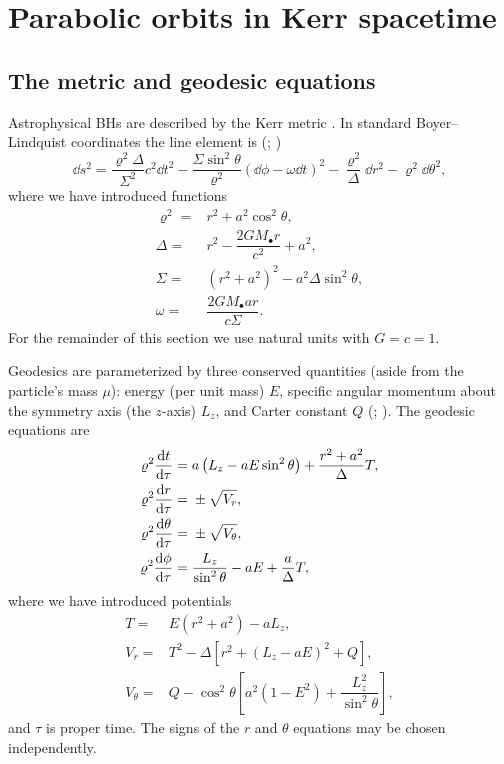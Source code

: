 \section{Parabolic orbits in Kerr spacetime}\label{sec:Geodesic}

\subsection{The metric and geodesic equations}

Astrophysical BHs are described by the Kerr metric \citep{Kerr1963}. In standard Boyer--Lindquist coordinates the line element is (\citealt{Boyer1967}; \citealt[section 13.7]{Hobson2006})
\begin{equation}
\dd s^2 = \dfrac{\varrho^2 \Delta}{\Sigma^2}c^2\dd t^2 - \dfrac{\Sigma \sin^2 \theta}{\varrho^2}\left(\dd \phi - \omega \dd t\right)^2 - \dfrac{\varrho^2}{\Delta}\dd r^2 - \varrho^2\dd \theta^2,
\end{equation}
where we have introduced functions
\begin{subequations}
\begin{align}
\varrho^2 = {} & r^2 + a^2\cos^2\theta,\\
\Delta = {} & r^2 - \dfrac{2GM_\bullet r}{c^2} + a^2,\\
\Sigma = {} & \left(r^2 +a^2\right)^2 - a^2\Delta\sin^2\theta,\\
\omega = {} & \dfrac{2GM_\bullet ar}{c\Sigma}.
\end{align}
\end{subequations}
For the remainder of this section we use natural units with $G = c = 1$.

Geodesics are parameterized by three conserved quantities (aside from the particle's mass $\mu$): energy (per unit mass) $E$, specific angular momentum about the symmetry axis (the $z$-axis) $L_z$, and Carter constant $Q$ (\citealt{Carter1968}; \citealt[section 62]{Chandrasekhar1992}). The geodesic equations are
\begin{subequations}
\begin{align}
\varrho^2 \dfrac{\mathrm{d} {t}}{\mathrm{d} {\tau}} = {} & a\left(L_z - aE\sin^2 \theta\right) + \dfrac{r^2 + a^2}{\Delta}T,\\
\varrho^2 \dfrac{\mathrm{d} {r}}{\mathrm{d} {\tau}} = {} & \pm \sqrt{V_r},\\
\varrho^2 \dfrac{\mathrm{d} {\theta}}{\mathrm{d} {\tau}} = {} & \pm \sqrt{V_\theta},\\
\varrho^2 \dfrac{\mathrm{d} {\phi}}{\mathrm{d} {\tau}} = {} & \dfrac{L_z}{\sin^2 \theta} - aE + \dfrac{a}{\Delta}T,
\end{align}
\end{subequations}
where we have introduced potentials
\begin{subequations}
\begin{align}
T = {} & E\left(r^2 +a^2\right) - aL_z,\\
V_r = {} & T^2 - \Delta\left[r^2 + \left(L_z - aE\right)^2 + Q\right],\\
V_\theta = {} & Q - \cos^2 \theta\left[a^2\left(1 - E^2\right) + \dfrac{L_z^2}{\sin^2\theta}\right],
\end{align}
\end{subequations}
and $\tau$ is proper time. The signs of the $r$ and $\theta$ equations may be chosen independently.

